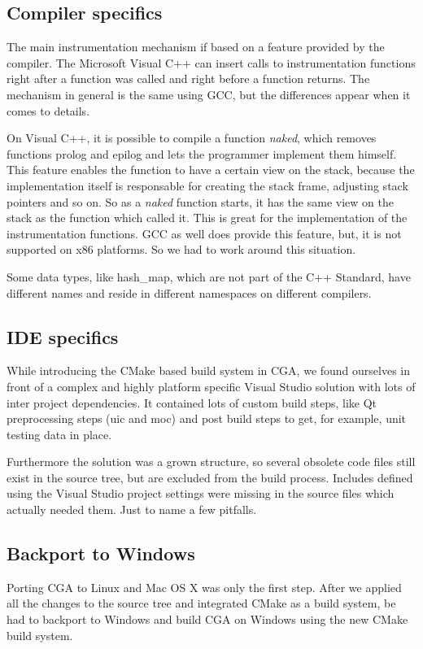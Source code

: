 \subsection{Compiler specifics} The main instrumentation mechanism if based on a feature provided by the compiler. The Microsoft Visual C++ can insert calls to instrumentation functions right after a function was called and right before a function returns. The mechanism in general is the same using GCC, but the differences appear when it comes to details. 

On Visual C++, it is possible to compile a function \emph{naked}, which removes functions prolog and epilog and lets the programmer implement them himself. This feature enables the function to have a certain view on the stack, because the implementation itself is responsable for creating the stack frame, adjusting stack pointers and so on. So as a \emph{naked} function starts, it has the same view on the stack as the function which called it. This is great for the implementation of the instrumentation functions. GCC as well does provide this feature, but, it is not supported on x86 platforms. So we had to work around this situation.

Some data types, like hash\_map, which are not part of the C++ Standard, have different names and reside in different namespaces on different compilers.

\subsection{IDE specifics} While introducing the CMake based build system in CGA, we found ourselves in front of a complex and highly platform specific Visual Studio solution with lots of inter project dependencies. It contained lots of custom build steps, like Qt preprocessing steps (uic and moc) and post build steps to get, for example, unit testing data in place.

Furthermore the solution was a grown structure, so several obsolete code files still exist in the source tree, but are excluded from the build process. Includes defined using the Visual Studio project settings were missing in the source files which actually needed them. Just to name a few pitfalls.

\subsection{Backport to Windows} Porting CGA to Linux and Mac OS X was only the first step. After we applied all the changes to the source tree and integrated CMake as a build system, be had to backport to Windows and build CGA on Windows using the new CMake build system.


